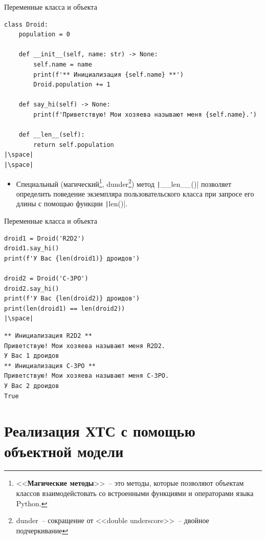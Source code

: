 \documentclass[aspectratio=169, mathserif]{beamer}	%
\begin{document}
\begin{frame}[fragile]{Переменные класса и объекта}
\scriptsize
\begin{verbatim}
class Droid:
    population = 0

    def __init__(self, name: str) -> None:
        self.name = name
        print(f'** Инициализация {self.name} **')
        Droid.population += 1

    def say_hi(self) -> None:
        print(f'Приветствую! Мои хозяева называют меня {self.name}.')

    def __len__(self):
        return self.population
|\space|
|\space|
\end{verbatim}
\vfill
\begin{itemize}
\item Специальный (магический\footnote{\tiny{<<\textbf{Магические методы}>>}~-- это методы, которые позволяют объектам классов взаимодейстовать со встроенными функциями и операторами языка Python.}, dunder\footnote{\tiny{dunder~-- сокращение от <<double underscore>>~-- двойное подчеркивание}}) метод \texttt|__len__()| позволяет определить поведение экземпляра пользовательского класса при запросе его длины с помощью функции \texttt|len()|.
\end{itemize}
\vfill
\end{frame}


\begin{frame}[fragile]{Переменные класса и объекта}
\scriptsize
\begin{verbatim}
droid1 = Droid('R2D2')
droid1.say_hi()
print(f'У Вас {len(droid1)} дроидов')

droid2 = Droid('C-3PO')
droid2.say_hi()
print(f'У Вас {len(droid2)} дроидов')
print(len(droid1) == len(droid2))
|\space|
\end{verbatim}
\begin{verbatim}
** Инициализация R2D2 **
Приветствую! Мои хозяева называют меня R2D2.
У Вас 1 дроидов
** Инициализация C-3PO **
Приветствую! Мои хозяева называют меня C-3PO.
У Вас 2 дроидов
True
\end{verbatim}
\vfill
\end{frame}

\section{Реализация ХТС с помощью \\ объектной модели}
\sectionframe
\end{document}
